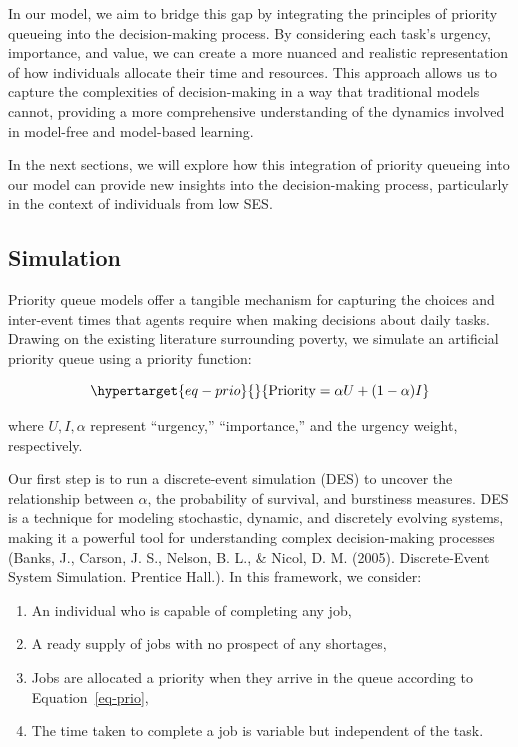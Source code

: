 \documentclass[
]{article}
\providecommand{\tightlist}{%
  \setlength{\itemsep}{0pt}\setlength{\parskip}{0pt}}\usepackage{longtable,booktabs,array}
\begin{document}
In our model, we aim to bridge this gap by integrating the principles of
priority queueing into the decision-making process. By considering each
task's urgency, importance, and value, we can create a more nuanced and
realistic representation of how individuals allocate their time and
resources. This approach allows us to capture the complexities of
decision-making in a way that traditional models cannot, providing a
more comprehensive understanding of the dynamics involved in model-free
and model-based learning.

In the next sections, we will explore how this integration of priority
queueing into our model can provide new insights into the
decision-making process, particularly in the context of individuals from
low SES.

\hypertarget{simulation}{%
\subsection{Simulation}\label{simulation}}

Priority queue models offer a tangible mechanism for capturing the
choices and inter-event times that agents require when making decisions
about daily tasks. Drawing on the existing literature surrounding
poverty, we simulate an artificial priority queue using a priority
function:

\begin{equation}\protect\hypertarget{eq-prio}{}{
\text{Priority} = \alpha U + (1- \alpha) I
}\label{eq-prio}\end{equation}

where \(U, I, \alpha\) represent ``urgency,'' ``importance,'' and the
urgency weight, respectively.

Our first step is to run a discrete-event simulation (DES) to uncover
the relationship between \(\alpha\), the probability of survival, and
burstiness measures. DES is a technique for modeling stochastic,
dynamic, and discretely evolving systems, making it a powerful tool for
understanding complex decision-making processes (Banks, J., Carson, J.
S., Nelson, B. L., \& Nicol, D. M. (2005). Discrete-Event System
Simulation. Prentice Hall.). In this framework, we consider:

\begin{enumerate}
\def\labelenumi{\arabic{enumi}.}
\tightlist
\item
  An individual who is capable of completing any job,
\item
  A ready supply of jobs with no prospect of any shortages,
\item
  Jobs are allocated a priority when they arrive in the queue according
  to Equation~\ref{eq-prio},
\item
  The time taken to complete a job is variable but independent of the
  task.
\end{enumerate}
\end{document}
